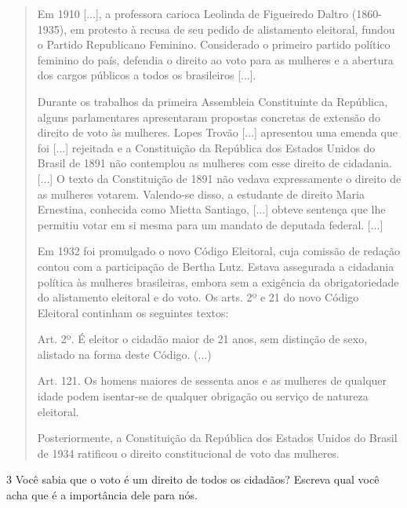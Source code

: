 \begin{itemize}
\begin{itemize}
\begin{itemize}
\begin{itemize}
{{\begin{itemize}
\begin{quote}
Em 1910 [...], a professora carioca Leolinda de Figueiredo Daltro
(1860-1935), em protesto à recusa de seu pedido de alistamento
eleitoral, fundou o Partido Republicano Feminino. Considerado o primeiro
partido político feminino do país, defendia o direito ao voto para as
mulheres e a abertura dos cargos públicos a todos os brasileiros [...].

Durante os trabalhos da primeira Assembleia Constituinte da República,
alguns parlamentares apresentaram propostas concretas de extensão do
direito de voto às mulheres. Lopes Trovão [...]
 apresentou uma emenda que foi
[...] rejeitada e a Constituição da República dos Estados Unidos do
Brasil de 1891 não contemplou as mulheres com esse direito de cidadania. [...]
O texto da Constituição de 1891 não vedava expressamente o
direito de as mulheres votarem. Valendo-se disso, a estudante de direito
Maria Ernestina, conhecida como Mietta Santiago, [...] obteve sentença
que lhe permitiu votar em si mesma para um mandato de deputada federal. [...]

Em 1932 foi promulgado o novo Código Eleitoral, cuja comissão de
redação contou com a participação de Bertha Lutz. Estava assegurada a
cidadania política às mulheres brasileiras, embora sem a exigência da
obrigatoriedade do alistamento eleitoral e do voto. Os arts. 2º e 21 do
novo Código Eleitoral continham os seguintes textos:

Art. 2º. É eleitor o cidadão maior de 21 anos, sem distinção de sexo,
alistado na forma deste Código. (...)

Art. 121. Os homens maiores de sessenta anos e as mulheres de qualquer
idade podem isentar-se de qualquer obrigação ou serviço de natureza
eleitoral.

Posteriormente, a Constituição da República dos Estados Unidos do Brasil
de 1934 ratificou o direito constitucional de voto das mulheres.

\end{quote}

\num{3} Você sabia que o voto é um direito de todos os cidadãos? Escreva qual
você acha que é a importância dele para nós.




\end{itemize}}}
\end{itemize}
\end{itemize}
\end{itemize}
\end{itemize}
